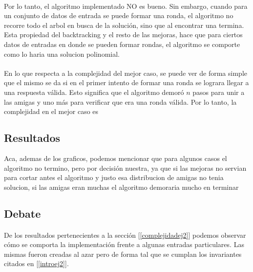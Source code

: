 \paragraph{}
Por lo tanto, el algoritmo implementado NO es bueno. Sin embargo, cuando para un conjunto de datos de entrada se puede formar una ronda, el algoritmo no recorre todo el arbol en busca de la solución, sino que al encontrar una termina. Esta propiedad del backtracking y el resto de las mejoras, hace que para ciertos datos de entradas en donde se pueden formar rondas, el algoritmo se comporte como lo haria una solucion polinomial.

\paragraph{}
En lo que respecta a la complejidad del mejor caso, se puede ver de forma simple que el mismo se da si en el primer intento de formar una ronda se lograra llegar a una respuesta válida. Esto significa que el algoritmo demoró $n$ pasos para unir a las amigas y uno más para verificar que era una ronda válida. Por lo tanto, la complejidad en el mejor caso es 
\subsection{Resultados}
\label{resultadosej2}
Aca, ademas de los graficos, podemos mencionar que para algunos casos el algoritmo no termino, pero por decisión nuestra, ya que si las mejoras no servian para cortar antes el algoritmo y justo esa distribucion de amigas no tenia solucion, si las amigas eran muchas el algoritmo demoraria mucho en terminar



\subsection{Debate}
\paragraph{}
De los resultados pertenecientes a la sección [\ref{complejidadej2}] podemos observar cómo se comporta la implementación frente a algunas entradas particulares. Las mismas fueron creadas al azar pero de forma tal que se cumplan los invariantes citados en [\ref{introej2}].


